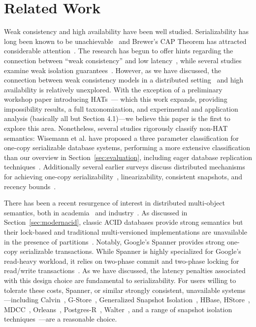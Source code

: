 
\section{Related Work}

Weak consistency and high availability have been well
studied. Serializability has long been known to be
unachievable~\cite{davidson-survey} and Brewer's CAP Theorem has
attracted considerable attention~\cite{gilbert-cap}. The research has
begun to offer hints regarding the connection between ``weak
consistency'' and low latency~\cite{abadi-pacelc}, while several
studies examine weak isolation guarantees~\cite{adya,
  ansicritique}. However, as we have discussed, the connection between
weak consistency models in a distributed setting~\cite{calm, crdt} and
high availability is relatively unexplored. With the exception of a
preliminary workshop paper introducing HATs~\cite{hat-hotos}--- which
this work expands, providing impossibility results, a full
taxonomization, and experimental and application analysis (basically
all but Section 4.1)---we believe this paper is the first to explore
this area. Nonetheless, several studies rigorously classify non-HAT
semantics: Wisemann et al. have proposed a three parameter
classification for one-copy serializable database systems, performing
a more extensive classification than our overview in
Section~\ref{sec:evaluation}, including eager database replication
techniques~\cite{kemme-classification}. Additionally several earlier
surveys discuss distributed mechanisms for achieving one-copy
serializability~\cite{wisemann-survey}, linearizability, consistent
snapshots, and recency bounds~\cite{ceri-mechanism, chen-mechanism}.

There has been a recent resurgence of interest in distributed
multi-object semantics, both in academia~\cite{kraska-s3, gstore,
  mdcc, eiger, walter,calvin, swift} and industry~\cite{orleans,
  spanner}. As discussed in Section~\ref{sec:modernacid}, classic ACID
databases provide strong semantics but their lock-based and
traditional multi-versioned implementations are unavailable in the
presence of partitions~\cite{bernstein-book, gray-isolation}. Notably,
Google's Spanner provides strong one-copy serializable
transactions. While Spanner is highly specialized for Google's
read-heavy workload, it relies on two-phase commit and two-phase
locking for read/write transactions~\cite{spanner}. As we have
discussed, the latency penalties associated with this design choice
are fundamental to serializability. For users willing to tolerate
these costs, Spanner, or similar strongly consistent, unavailable
systems---including Calvin~\cite{calvin}, G-Store~\cite{gstore},
Generalized Snapshot Isolation~\cite{generalizedsnapshot}, HBase,
HStore~\cite{hstore}, MDCC~\cite{mdcc}, Orleans~\cite{orleans},
Postgres-R~\cite{kemme-thesis}, Walter~\cite{walter}, and a range of
snapshot isolation techniques~\cite{middleware-db, kemme-snapshot,
  daudjee-snapshot}---are a reasonable choice.

